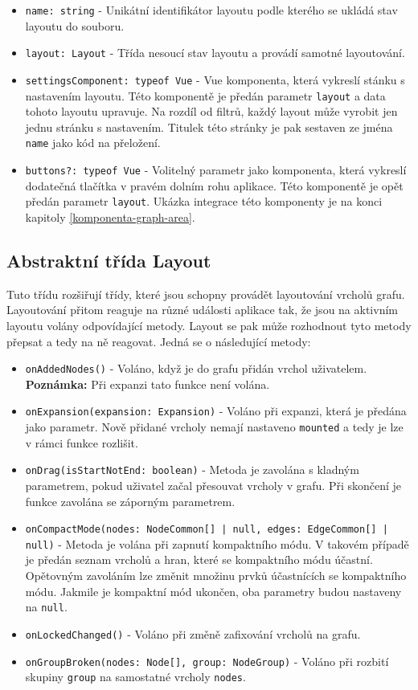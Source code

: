 \begin{itemize}
  \item \texttt{name: string} - Unikátní identifikátor layoutu podle kterého se ukládá stav layoutu do souboru.
  \item \texttt{layout: Layout} - Třída nesoucí stav layoutu a provádí samotné layoutování.
  \item \texttt{settingsComponent: typeof Vue} - Vue komponenta, která vykreslí stánku s nastavením layoutu. Této komponentě je předán parametr \texttt{layout} a data tohoto layoutu upravuje. Na rozdíl od filtrů, každý layout může vyrobit jen jednu stránku s nastavením. Titulek této stránky je pak sestaven ze jména \texttt{name} jako kód na přeložení.
  \item \texttt{buttons?: typeof Vue} - Volitelný parametr jako komponenta, která vykreslí dodatečná tlačítka v pravém dolním rohu aplikace. Této komponentě je opět předán parametr \texttt{layout}. Ukázka integrace této komponenty je na konci kapitoly \ref{komponenta-graph-area}.
\end{itemize}

\subsection{Abstraktní třída Layout}
Tuto třídu rozšiřují třídy, které jsou schopny provádět layoutování vrcholů grafu. Layoutování přitom reaguje na různé události aplikace tak, že jsou na aktivním layoutu volány odpovídající metody. Layout se pak může rozhodnout tyto metody přepsat a tedy na ně reagovat. Jedná se o následující metody:

\begin{itemize}
  \item \texttt{onAddedNodes()} - Voláno, když je do grafu přidán vrchol uživatelem. \textbf{Poznámka:} Při expanzi tato funkce není volána.
  \item \texttt{onExpansion(expansion: Expansion)} - Voláno při expanzi, která je předána jako parametr. Nově přidané vrcholy nemají nastaveno \texttt{mounted} a tedy je lze v rámci funkce rozlišit.
  \item \texttt{onDrag(isStartNotEnd: boolean)} - Metoda je zavolána s kladným parametrem, pokud uživatel začal přesouvat vrcholy v grafu. Při skončení je funkce zavolána se záporným parametrem.
  \item \texttt{onCompactMode(nodes: NodeCommon[] | null, edges: EdgeCommon[] | null)} - Metoda je volána při zapnutí kompaktního módu. V takovém případě je předán seznam vrcholů a hran, které se kompaktního módu účastní. Opětovným zavoláním lze změnit množinu prvků účastnících se kompaktního módu. Jakmile je kompaktní mód ukončen, oba parametry budou nastaveny na \texttt{null}.
  \item \texttt{onLockedChanged()} - Voláno při změně zafixování vrcholů na grafu.
  \item \texttt{onGroupBroken(nodes: Node[], group: NodeGroup)} - Voláno při rozbití skupiny \texttt{group} na samostatné vrcholy \texttt{nodes}.
\end{itemize}

